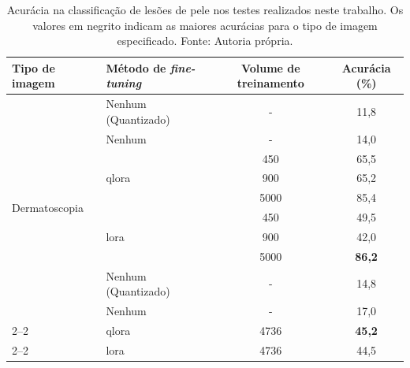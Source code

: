 \begin{table}[ht]
    \centering
    \begin{tabular}{l|l|c|c}
        \hline
        Tipo de imagem                  & Método de \textit{fine-tuning} & Volume de treinamento & Acurácia (\%) \\
        \hline
        \multirow{10}{*}{Dermatoscopia} & Nenhum (Quantizado)            & -                     & 11,8          \\
                                        & Nenhum                         & -                     & 14,0          \\
        \cline{2--2}
                                        & \multirow{3}{*}{\ac{qlora}}    & 450                   & 65,5          \\
                                        &                                & 900                   & 65,2          \\
                                        &                                & 5000                  & 85,4          \\
        \cline{2--2}
                                        & \multirow{3}{*}{\ac{lora}}     & 450                   & 49,5          \\
                                        &                                & 900                   & 42,0          \\
                                        &                                & 5000                  & \textbf{86,2} \\
        \hline
        \multirow{4}{*}{Aproximação}    & Nenhum (Quantizado)            & -                     & 14,8          \\
                                        & Nenhum                         & -                     & 17,0          \\
        \cline{2--2}
                                        & \ac{qlora}                     & 4736                  & \textbf{45,2} \\
        \cline{2--2}
                                        & \ac{lora}                      & 4736                  & 44,5          \\
        \hline
    \end{tabular}
    \label{tab:overall_comparison_skin_lesions}
    \caption{Acurácia na classificação de lesões de pele nos testes realizados neste trabalho. Os valores em
    negrito indicam as maiores acurácias para o tipo de imagem especificado. Fonte: Autoria própria.}
\end{table}

